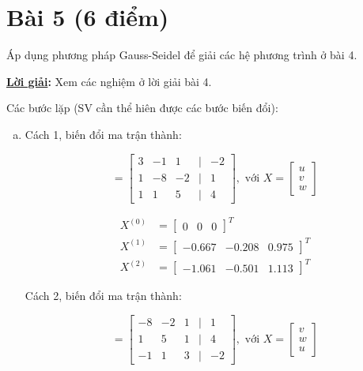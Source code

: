 \documentclass[12pt]{article}
\newcommand{\Solution}{
\medskip
{\bf \underline{Lời giải}:}
}
\begin{document}
\section{Bài 5 (6 điểm)}

Áp dụng phương pháp Gauss-Seidel để giải các hệ phương trình ở bài 4.

\Solution Xem các nghiệm ở lời giải bài 4.

Các bước lặp (SV cần thể hiên được các bước biến đổi):

\begin{enumerate}[a)]

\item Cách 1, biến đổi ma trận thành:

\begin{equation}
 [A|B]=\begin{bmatrix}  3 & -1 & 1 & | & -2\\ 1 & -8 & -2 & | & 1\\ 1 & 1 & 5 & | & 4 \end{bmatrix}, \textrm{~với~} X=\begin{bmatrix}  u\\v\\w \end{bmatrix}
\end{equation}

\begin{align*}
X^{(0)} &= \begin{bmatrix} 
0 & 0 & 0 
\end{bmatrix}^T\\
X^{(1)} &= \begin{bmatrix}
-0.667 & -0.208 & 0.975
\end{bmatrix}^T\\
X^{(2)} &= \begin{bmatrix}
-1.061 & -0.501 & 1.113
\end{bmatrix}^T
\end{align*}

Cách 2, biến đổi ma trận thành:

\begin{equation}
 [A|B]=\begin{bmatrix}  -8 & -2 & 1 & | & 1\\ 1 & 5 & 1 & | & 4 \\ -1 & 1 & 3 & | & -2 \end{bmatrix}, \textrm{~với~} X=\begin{bmatrix}  v\\w\\u \end{bmatrix}
\end{equation}


\end{enumerate}
\end{document}
